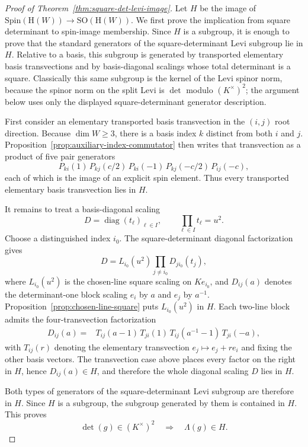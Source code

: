\documentclass{birkjour}
\theoremstyle{plain}
\theoremstyle{definition}
\theoremstyle{remark}
\numberwithin{equation}{section}
\newcommand{\Spin}{\mathrm{Spin}}
\newcommand{\SO}{\mathrm{SO}}
\newcommand{\Hyp}{\mathrm{H}}
\begin{document}
\begin{proof}[Proof of Theorem~\ref{thm:square-det-levi-image}]
Let \(H\) be the image of \(\Spin(\Hyp(W))\to\SO(\Hyp(W))\). We first
prove the implication from square determinant to spin-image membership. Since
\(H\) is a subgroup, it is enough to prove that the standard generators of the
square-determinant Levi subgroup lie in \(H\). Relative to a basis, this subgroup
is generated by transported elementary basis transvections and by basis-diagonal
scalings whose total determinant is a square. Classically this same subgroup is
the kernel of the Levi spinor norm, because the spinor norm on the split Levi is
\(\det\) modulo \((K^\times)^2\); the argument below uses only the displayed
square-determinant generator description.

First consider an elementary transported basis transvection in the \((i,j)\)
root direction. Because \(\dim W\ge3\), there is a basis index \(k\) distinct
from both \(i\) and \(j\). Proposition~\ref{prop:auxiliary-index-commutator}
then writes that transvection as a product of five pair generators
\[
  P_{ki}(1)\,P_{kj}(c/2)\,P_{ki}(-1)\,P_{kj}(-c/2)\,P_{ij}(-c),
\]
each of which is the image of an explicit spin element. Thus every transported
elementary basis transvection lies in \(H\).

It remains to treat a basis-diagonal scaling
\[
  D=\operatorname{diag}(t_\ell)_{\ell\in I},\qquad \prod_{\ell\in I}t_\ell=u^2.
\]
Choose a distinguished index \(i_0\). The square-determinant diagonal
factorization gives
\[
  D=L_{i_0}(u^2)\prod_{j\ne i_0}D_{j i_0}(t_j),
\]
where \(L_{i_0}(u^2)\) is the chosen-line square scaling on \(Ke_{i_0}\), and
\(D_{ij}(a)\) denotes the determinant-one block scaling \(e_i\) by \(a\) and
\(e_j\) by \(a^{-1}\). Proposition~\ref{prop:chosen-line-square} puts
\(L_{i_0}(u^2)\) in \(H\). Each two-line block admits the four-transvection
factorization
\[
\begin{aligned}
  D_{ij}(a)=&
  T_{ij}(a-1)\,T_{ji}(1)\,T_{ij}(a^{-1}-1)\,T_{ji}(-a),
\end{aligned}
\]
with \(T_{ij}(r)\) denoting the elementary transvection
\(e_j\mapsto e_j+r e_i\) and fixing the other basis vectors. The transvection
case above places every factor on the right in \(H\), hence
\(D_{ij}(a)\in H\), and therefore the whole diagonal scaling \(D\) lies in
\(H\).

Both types of generators of the square-determinant Levi subgroup are therefore
in \(H\). Since \(H\) is a subgroup, the subgroup generated by them is contained
in \(H\). This proves
\[
  \det(g)\in(K^\times)^2 \quad\Longrightarrow\quad \Lambda(g)\in H.
\]


\end{proof}
\end{document}
